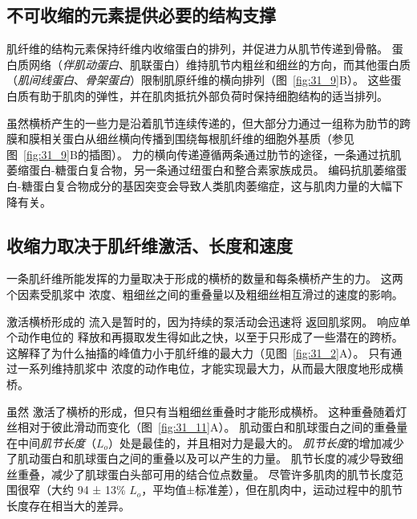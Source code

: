 \subsection{不可收缩的元素提供必要的结构支撑}

肌纤维的结构元素保持纤维内收缩蛋白的排列，并促进力从肌节传递到骨骼。
蛋白质网络（\textit{伴肌动蛋白}、肌联蛋白）维持肌节内粗丝和细丝的方向，而其他蛋白质（\textit{肌间线蛋白}、\textit{骨架蛋白}）限制肌原纤维的横向排列（图~\ref{fig:31_9}B）。
这些蛋白质有助于肌肉的弹性，并在肌肉抵抗外部负荷时保持细胞结构的适当排列。


虽然横桥产生的一些力是沿着肌节连续传递的，但大部分力通过一组称为肋节的跨膜和膜相关蛋白从细丝横向传播到围绕每根肌纤维的细胞外基质（参见图~\ref{fig:31_9}B的插图）。
力的横向传递遵循两条通过肋节的途径，一条通过抗肌萎缩蛋白-糖蛋白复合物，另一条通过纽蛋白和整合素家族成员。
编码抗肌萎缩蛋白-糖蛋白复合物成分的基因突变会导致人类肌肉萎缩症，这与肌肉力量的大幅下降有关。



\subsection{收缩力取决于肌纤维激活、长度和速度}

一条肌纤维所能发挥的力量取决于形成的横桥的数量和每条横桥产生的力。
这两个因素受肌浆中  浓度、粗细丝之间的重叠量以及粗细丝相互滑过的速度的影响。


激活横桥形成的  流入是暂时的，因为持续的泵活动会迅速将  返回肌浆网。
响应单个动作电位的  释放和再摄取发生得如此之快，以至于只形成了一些潜在的跨桥。
这解释了为什么抽搐的峰值力小于肌纤维的最大力（见图~\ref{fig:31_2}A）。
只有通过一系列维持肌浆中  浓度的动作电位，才能实现最大力，从而最大限度地形成横桥。


虽然  激活了横桥的形成，但只有当粗细丝重叠时才能形成横桥。
这种重叠随着灯丝相对于彼此滑动而变化（图~\ref{fig:31_11}A）。 
肌动蛋白和肌球蛋白之间的重叠量在中间\textit{肌节长度}（$ L_o $）处是最佳的，并且相对力是最大的。
\textit{肌节长度}的增加减少了肌动蛋白和肌球蛋白之间的重叠以及可以产生的力量。
肌节长度的减少导致细丝重叠，减少了肌球蛋白头部可用的结合位点数量。
尽管许多肌肉的肌节长度范围很窄（大约 94 ± 13\% $ L_o $，平均值±标准差），但在肌肉中，运动过程中的肌节长度存在相当大的差异。


